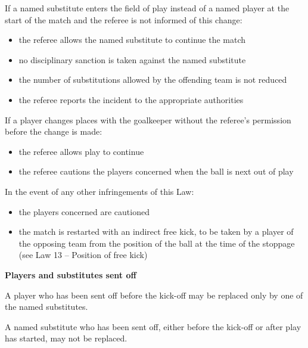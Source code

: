 \bigskip

If a named substitute enters the field of play instead of a named player at the start of the match and the referee is not informed of this change:

\begin{itemize}
\item the referee allows the named substitute to continue the match 
\item no disciplinary sanction is taken against the named substitute 
\item the number of substitutions allowed by the offending team is not reduced 
\item the referee reports the incident to the appropriate authorities
\end{itemize}

\bigskip

If a player changes places with the goalkeeper without the
referee's permission before the change is made: 

\begin{itemize}
\item the referee allows play to continue
\item the referee cautions the players concerned when the ball is next out of play
\end{itemize}

\bigskip

In the event of any other infringements of this Law:

\begin{itemize}
\item the players concerned are cautioned
\item the match is restarted with an indirect free kick, to be taken by a player of the opposing team from the position of the ball at the time of the stoppage (see Law 13 -- Position of free kick)
\end{itemize}

\bigskip

{\bfseries Players and substitutes sent off}

\headlinebox

A player who has been sent off before the kick-off may be replaced only by one of the named substitutes.

\bigskip

A named substitute who has been sent off, either before the kick-off or after play has started, may not be replaced.